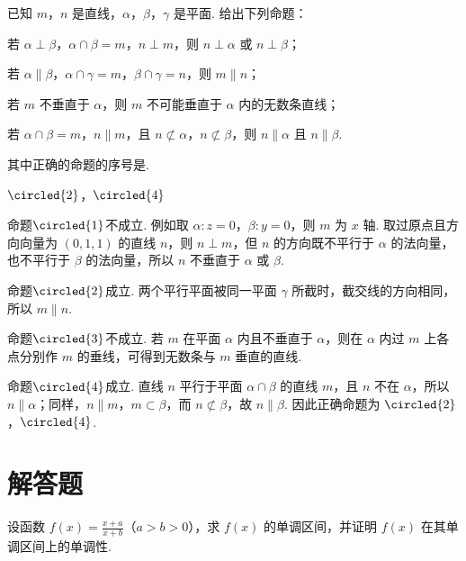 \begin{problem}
已知 \(m\)，\(n\) 是直线，\(\alpha\)，\(\beta\)，\(\gamma\) 是平面. 给出下列命题：
\begin{circlelist}
\item 若 \(\alpha \perp \beta\)，\(\alpha \cap \beta = m\)，\(n \perp m\)，则 \( n \perp \alpha \) 或 \( n \perp \beta \)；
\item 若 \(\alpha \parallel \beta\)，\(\alpha \cap \gamma = m\)，\(\beta \cap \gamma = n\)，则 \( m \parallel n \)；
\item 若 \( m \) 不垂直于 \( \alpha \)，则 \( m \) 不可能垂直于 \( \alpha \) 内的无数条直线；
\item 若 \(\alpha \cap \beta = m\)，\(n \parallel m\)，且 \(n \not\subset \alpha\)，\(n \not\subset \beta\)，则 \( n \parallel \alpha \) 且 \( n \parallel \beta \).
\end{circlelist}
其中正确的命题的序号是\fillinblank{}.
\end{problem}

\begin{answer}
\(\circled{2}\)，\(\circled{4}\)
\end{answer}

\begin{solution}
命题\(\circled{1}\)不成立. 例如取 \(\alpha:z=0\)，\(\beta:y=0\)，则 \(m\) 为 \(x\) 轴. 取过原点且方向向量为 \((0,1,1)\) 的直线 \(n\)，则 \(n\perp m\)，但 \(n\) 的方向既不平行于 \(\alpha\) 的法向量，也不平行于 \(\beta\) 的法向量，所以 \(n\) 不垂直于 \(\alpha\) 或 \(\beta\).

命题\(\circled{2}\)成立. 两个平行平面被同一平面 \(\gamma\) 所截时，截交线的方向相同，所以 \(m\parallel n\).

命题\(\circled{3}\)不成立. 若 \(m\) 在平面 \(\alpha\) 内且不垂直于 \(\alpha\)，则在 \(\alpha\) 内过 \(m\) 上各点分别作 \(m\) 的垂线，可得到无数条与 \(m\) 垂直的直线.

命题\(\circled{4}\)成立. 直线 \(n\) 平行于平面 \(\alpha\cap\beta\) 的直线 \(m\)，且 \(n\) 不在 \(\alpha\)，所以 \(n\parallel\alpha\)；同样，\(n\parallel m\)，\(m\subset\beta\)，而 \(n\not\subset\beta\)，故 \(n\parallel\beta\). 因此正确命题为 \(\circled{2}\)，\(\circled{4}\).
\end{solution}

\section{解答题}
\begin{problem}
设函数 \(f(x)=\frac{x+a}{x+b}\)（\(a>b>0\)），求 \(f(x)\) 的单调区间，并证明 \(f(x)\) 在其单调区间上的单调性.
\end{problem}

